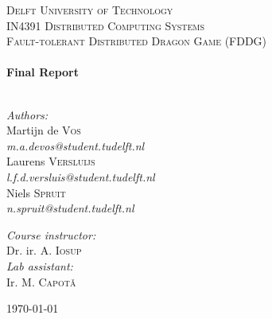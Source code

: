 \begin{titlepage}

\begin{center}


\textsc{\Large Delft University of Technology }\\[1.5cm]

\textsc{\large IN4391 Distributed Computing Systems}\\[0.5cm]
\textsc{\normalsize Fault-tolerant Distributed Dragon Game (FDDG)}\\[0.5cm]


\HRule \\[0.4cm]
{ \huge \bfseries Final Report}\\[0.4cm]

\HRule \\[1.5cm]

\begin{minipage}{0.4\textwidth}
\begin{flushleft} \large
\emph{Authors:}\\
Martijn de \textsc{Vos} \\ [0.1cm]
\emph{m.a.devos@student.tudelft.nl} \\ [0.1cm]
Laurens \textsc{Versluijs} \\ [0.1cm]
\emph{l.f.d.versluis@student.tudelft.nl} \\ [0.1cm]
Niels \textsc{Spruit} \\ [0.1cm]
\emph{n.spruit@student.tudelft.nl} \\ [0.1cm]
\end{flushleft}
\end{minipage}
\begin{minipage}{0.4\textwidth}
\begin{flushright} \large
\emph{Course instructor:} \\
Dr. ir. A. \textsc{Iosup}\\
\emph{Lab assistant:} \\
Ir. M. \textsc{Capot\v{a}} 
\end{flushright}
\end{minipage}
\vspace{30mm}

\vfill

{\large \today}

\end{center}

\end{titlepage}